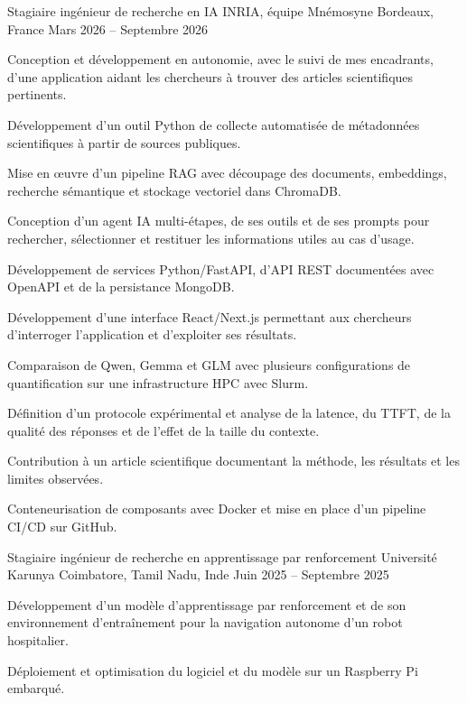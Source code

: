 
\begin{cventries}
  \cventry
    {Stagiaire ingénieur de recherche en IA}
    {INRIA, équipe Mnémosyne}
    {Bordeaux, France}
    {Mars 2026 -- Septembre 2026}
    {
      \begin{cvitems}
        \item {Conception et développement en autonomie, avec le suivi de mes encadrants, d’une application aidant les chercheurs à trouver des articles scientifiques pertinents.}
        \item {Développement d’un outil Python de collecte automatisée de métadonnées scientifiques à partir de sources publiques.}
        \item {Mise en œuvre d’un pipeline RAG avec découpage des documents, embeddings, recherche sémantique et stockage vectoriel dans ChromaDB.}
        \item {Conception d’un agent IA multi-étapes, de ses outils et de ses prompts pour rechercher, sélectionner et restituer les informations utiles au cas d’usage.}
        \item {Développement de services Python/FastAPI, d’API REST documentées avec OpenAPI et de la persistance MongoDB.}
        \item {Développement d’une interface React/Next.js permettant aux chercheurs d’interroger l’application et d’exploiter ses résultats.}
        \item {Comparaison de Qwen, Gemma et GLM avec plusieurs configurations de quantification sur une infrastructure HPC avec Slurm.}
        \item {Définition d’un protocole expérimental et analyse de la latence, du TTFT, de la qualité des réponses et de l’effet de la taille du contexte.}
        \item {Contribution à un article scientifique documentant la méthode, les résultats et les limites observées.}
        \item {Conteneurisation de composants avec Docker et mise en place d’un pipeline CI/CD sur GitHub.}
      \end{cvitems}
    }

  \cventry
    {Stagiaire ingénieur de recherche en apprentissage par renforcement}
    {Université Karunya}
    {Coimbatore, Tamil Nadu, Inde}
    {Juin 2025 -- Septembre 2025}
    {
      \begin{cvitems}
        \item {Développement d’un modèle d’apprentissage par renforcement et de son environnement d’entraînement pour la navigation autonome d’un robot hospitalier.}
        \item {Déploiement et optimisation du logiciel et du modèle sur un Raspberry Pi embarqué.}
      \end{cvitems}
    }
\end{cventries}
